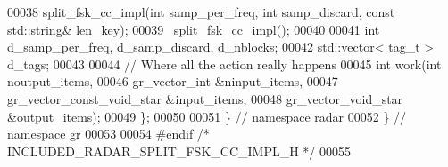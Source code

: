 \begin{DoxyCode}
00038       split_fsk_cc_impl(\textcolor{keywordtype}{int} samp_per_freq, \textcolor{keywordtype}{int} samp\_discard, \textcolor{keyword}{const} std::string& len\_key);
00039       ~split_fsk_cc_impl();
00040       
00041       \textcolor{keywordtype}{int} d_samp_per_freq, d_samp_discard, d_nblocks;
00042       std::vector< tag\_t > d_tags;
00043 
00044       \textcolor{comment}{// Where all the action really happens}
00045       \textcolor{keywordtype}{int} work(\textcolor{keywordtype}{int} noutput\_items,
00046                gr\_vector\_int &ninput\_items,
00047                gr\_vector\_const\_void\_star &input\_items,
00048                gr\_vector\_void\_star &output\_items);
00049     \};
00050 
00051   \} \textcolor{comment}{// namespace radar}
00052 \} \textcolor{comment}{// namespace gr}
00053 
00054 \textcolor{preprocessor}{#endif }\textcolor{comment}{/* INCLUDED\_RADAR\_SPLIT\_FSK\_CC\_IMPL\_H */}\textcolor{preprocessor}{}
00055 
\end{DoxyCode}
